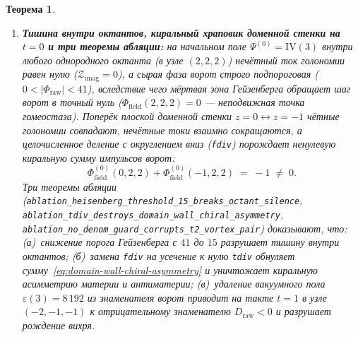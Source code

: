 \documentclass[11pt,a4paper]{article}
\theoremstyle{plain}
\newtheorem{theorem}{Теорема}[section]
\theoremstyle{definition}
\begin{document}
\begin{theorem}
\begin{enumerate}[label=\textbf{(\arabic*)},leftmargin=*]
\item \textbf{Тишина внутри октантов, киральный храповик доменной стенки на $t = 0$ и три теоремы абляции:}
  на начальном поле $\Psi^{(0)} = \mathrm{IV}(3)$ внутри любого однородного октанта (в узле $(2, 2, 2)$) нечётный ток голономии равен нулю ($\mathcal{Z}_{\mathrm{imag}} = 0$), а сырая фаза ворот строго подпороговая ($0 < |\Phi_{\mathrm{raw}}| < 41$), вследствие чего мёртвая зона Гейзенберга обращает шаг ворот в точный нуль ($\Phi_{\mathrm{field}}(2,2,2) = 0$ --- неподвижная точка гомеостаза). Поперёк плоской доменной стенки $z = 0 \leftrightarrow z = -1$ чётные голономии совпадают, нечётные токи взаимно сокращаются, а целочисленное деление с округлением вниз (\texttt{fdiv}) порождает ненулевую киральную сумму импульсов ворот:
  \begin{equation}
    \label{eq:domain-wall-chiral-asymmetry}
    \Phi_{\mathrm{field}}^{(0)}(0, 2, 2) + \Phi_{\mathrm{field}}^{(0)}(-1, 2, 2) \;=\; -1 \;\ne\; 0.
  \end{equation}
  Три теоремы абляции (\texttt{ablation\_heisenberg\_threshold\_15\_breaks\_octant\_silence}, \texttt{ablation\_tdiv\_destroys\_domain\_wall\_chiral\_asymmetry}, \texttt{ablation\_no\_denom\_guard\_corrupts\_t2\_vortex\_pair}) доказывают, что: (а)~снижение порога Гейзенберга с $41$ до $15$ разрушает тишину внутри октантов; (б)~замена \texttt{fdiv} на усечение к нулю \texttt{tdiv} обнуляет сумму~\eqref{eq:domain-wall-chiral-asymmetry} и уничтожает киральную асимметрию материи и антиматерии; (в)~удаление вакуумного пола $\varepsilon(3) = 8\,192$ из знаменателя ворот приводит на такте $t = 1$ в узле $(-2, -1, -1)$ к отрицательному знаменателю $D_{\mathrm{raw}} < 0$ и разрушает рождение вихря.


\end{enumerate}
\end{theorem}
\end{document}
